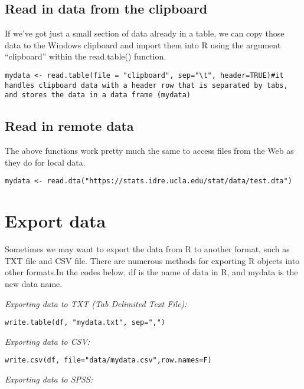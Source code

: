 \documentclass[]{book}
\theoremstyle{definition}
\theoremstyle{definition}
\theoremstyle{definition}
\theoremstyle{remark}
\begin{document}
\subsection{Read in data from the
clipboard}\label{read-in-data-from-the-clipboard}

If we've got just a small section of data already in a table, we can
copy those data to the Windows clipboard and import them into R using
the argument ``clipboard'' within the read.table() function.

\begin{verbatim}
mydata <- read.table(file = "clipboard", sep="\t", header=TRUE)#it handles clipboard data with a header row that is separated by tabs, and stores the data in a data frame (mydata)
\end{verbatim}

\subsection{Read in remote data}\label{read-in-remote-data}

The above functions work pretty much the same to access files from the
Web as they do for local data.

\begin{verbatim}
mydata <- read.dta("https://stats.idre.ucla.edu/stat/data/test.dta")
\end{verbatim}

\section{Export data}\label{export-data}

Sometimes we may want to export the data from R to another format, such
as TXT file and CSV file. There are numerous methods for exporting R
objects into other formats.In the codes below, df is the name of data in
R, and mydata is the new data name.

\emph{Exporting data to TXT (Tab Delimited Text File):}

\begin{verbatim}
write.table(df, "mydata.txt", sep=",")
\end{verbatim}

\emph{Exporting data to CSV:}

\begin{verbatim}
write.csv(df, file="data/mydata.csv",row.names=F)
\end{verbatim}

\emph{Exporting data to SPSS:}
\end{document}
